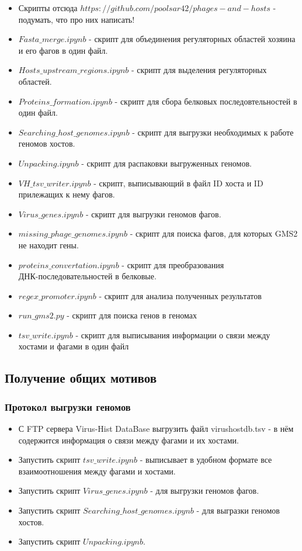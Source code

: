 \documentclass[a4paper,12pt]{article}
\begin{document}
\begin{itemize}
    \item Скрипты отсюда \(https://github.com/poolsar42/phages-and-hosts\) - подумать, что про них написать!
    \cite{github}
    
    \item \(Fasta\_merge.ipynb\) - скрипт для объединения регуляторных областей хозяина и его фагов в один файл.
    \item \(Hosts\_upstream\_regions.ipynb\) - скрипт для выделения регуляторных областей.
    \item \(Proteins\_formation.ipynb\) - скрипт для сбора белковых последовтельностей в один файл.
    \item \(Searching\_host\_genomes.ipynb\) - скрипт для выгрузки необходимых к работе геномов хостов.
    \item \(Unpacking.ipynb\) - скрипт для распаковки выгруженных геномов.
    \item \(VH\_tsv\_writer.ipynb\) - скрипт, выписывающий в файл ID хоста и ID прилежащих к нему фагов.
    \item \(Virus\_genes.ipynb\) - скрипт для выгрузки геномов фагов.
    \item \(missing\_phage\_genomes.ipynb\) - скрипт для поиска фагов, для которых GMS2 не находит гены.
    \item \(proteins\_convertation.ipynb \) - скрипт для преобразования \\ ДНК-последовательностей
                                в белковые.
    \item \(regex\_promoter.ipynb \) - скрипт для анализа полученных результатов
    \item \(run\_gms2.py\) - скрипт для поиска генов в геномах
    \item \(tsv\_write.ipynb\) - скрипт для выписывания информации о связи между хостами и фагами в один файл
\end{itemize}

\subsection{Получение общих мотивов}
    \subsubsection{Протокол выгрузки геномов}
    \begin{itemize}
        \item С FTP сервера Virus-Hist DataBase выгрузить файл virushostdb.tsv - в нём содержится информация о связи между фагами и их хостами.
    
        \item Запустить скрипт \(tsv\_write.ipynb\) - выписывает в удобном формате все взаимоотношения между фагами и хостами.
    
      \item Запустить скрипт \(Virus\_genes.ipynb\) - для выгрузки геномов фагов.
        \item Запустить скрипт \(Searching\_host\_genomes.ipynb\) - для выгразки геномов хостов.
        \item Запустить скрипт \(Unpacking.ipynb\).

    \end{itemize}
\end{document}
